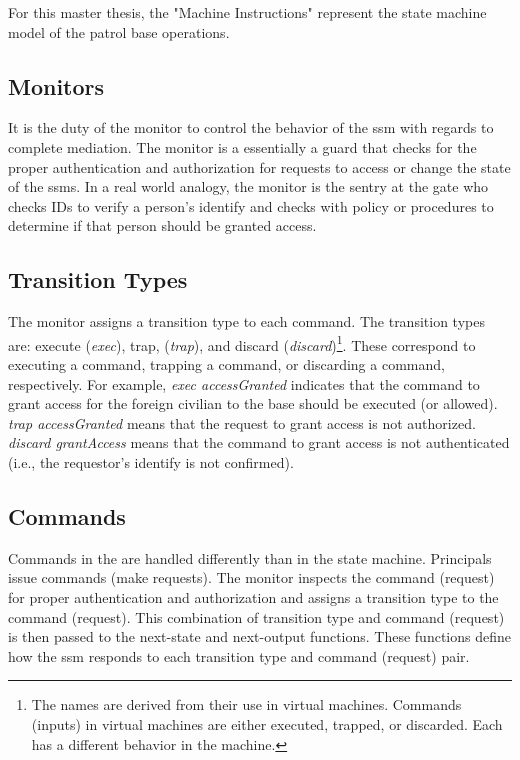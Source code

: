 \documentclass[../../main/main.tex]{subfiles}
\begin{document}
For this master thesis, the "Machine Instructions" represent the state machine model of the patrol base operations.


 
\subsection{Monitors}\label{monitors}
It is the duty of the monitor to control the behavior of the \gls{ssm} with regards to complete mediation.  The monitor is a essentially a guard that checks for the proper authentication and authorization for requests to access or change the state of the \glspl{ssm}.  In a real world analogy, the monitor is the sentry at the gate who checks IDs to verify a person's identify and checks with policy or procedures to determine if that person should be granted access.  

\subsection{Transition Types}
The monitor assigns a transition type to each command.  The transition types are: execute (\textit{exec}), trap, (\textit{trap}), and discard (\textit{discard})\footnote{The names are derived from their use in virtual machines.  Commands (inputs) in virtual machines are either executed, trapped, or discarded.  Each has a different behavior in the machine.}.  These correspond to executing a command, trapping a command, or discarding a command, respectively.  For example, \textit{exec accessGranted} indicates that the command to grant access for the foreign civilian to the base should be executed (or allowed).  \textit{trap accessGranted} means that the request to grant access is not authorized.  \textit{discard grantAccess} means that the command to grant access is not authenticated (i.e., the requestor's identify is not confirmed).

\subsection{Commands}
Commands in the  are handled differently than in the state machine.  Principals issue commands (make requests).  The monitor inspects the command (request) for proper authentication and authorization and assigns a transition type to the command (request).  This combination of transition type and command (request) is then passed to the next-state and next-output functions.  These functions define how the \gls{ssm} responds to each transition type and command (request) pair.  
\end{document}
